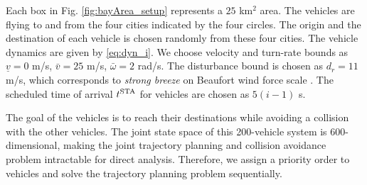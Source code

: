 Each box in Fig. \ref{fig:bayArea_setup} represents a $25$ km$^2$ area. The vehicles are flying to and from the four cities indicated by the four circles. The origin and the destination of each vehicle is chosen randomly from these four cities. The vehicle dynamics are given by \eqref{eq:dyn_i}. We choose velocity and turn-rate bounds as $\underline{v} = 0$ m/s, $\bar{v} = 25$ m/s, $\bar\omega = 2$ rad/s. The disturbance bound is chosen as $d_{r} = 11$ m/s, which corresponds to \textit{strong breeze} on Beaufort wind force scale \cite{Windscale}. The scheduled time of arrival $t^\text{STA}$ for vehicles are chosen as $5(i-1)$ s.

The goal of the vehicles is to reach their destinations while avoiding a collision with the other vehicles. The joint state space of this 200-vehicle system is 600-dimensional, making the joint trajectory planning and collision avoidance problem intractable for direct analysis. Therefore, we assign a priority order to vehicles and solve the trajectory planning problem sequentially.